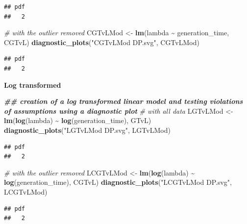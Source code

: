 \documentclass[
]{article}
\newenvironment{Shaded}{\begin{snugshade}}{\end{snugshade}}
\newcommand{\CommentTok}[1]{\textcolor[rgb]{0.56,0.35,0.01}{\textit{#1}}}
\newcommand{\DocumentationTok}[1]{\textcolor[rgb]{0.56,0.35,0.01}{\textbf{\textit{#1}}}}
\newcommand{\FunctionTok}[1]{\textcolor[rgb]{0.13,0.29,0.53}{\textbf{#1}}}
\newcommand{\NormalTok}[1]{#1}
\newcommand{\OtherTok}[1]{\textcolor[rgb]{0.56,0.35,0.01}{#1}}
\newcommand{\SpecialCharTok}[1]{\textcolor[rgb]{0.81,0.36,0.00}{\textbf{#1}}}
\newcommand{\StringTok}[1]{\textcolor[rgb]{0.31,0.60,0.02}{#1}}
\begin{document}
\begin{verbatim}
## pdf 
##   2
\end{verbatim}

\begin{Shaded}
\begin{Highlighting}[]
\CommentTok{\# with the outlier removed}
\NormalTok{CGTvLMod }\OtherTok{\textless{}{-}} \FunctionTok{lm}\NormalTok{(lambda }\SpecialCharTok{\textasciitilde{}}\NormalTok{ generation\_time, CGTvL)}
\FunctionTok{diagnostic\_plots}\NormalTok{(}\StringTok{"CGTvLMod DP.svg"}\NormalTok{, CGTvLMod)}
\end{Highlighting}
\end{Shaded}

\begin{verbatim}
## pdf 
##   2
\end{verbatim}

\textbf{Log transformed}

\begin{Shaded}
\begin{Highlighting}[]
\DocumentationTok{\#\# creation of a log transformed linear model and testing violations of assumptions using a diagnostic plot}
\CommentTok{\# with all data}
\NormalTok{LGTvLMod }\OtherTok{\textless{}{-}} \FunctionTok{lm}\NormalTok{(}\FunctionTok{log}\NormalTok{(lambda) }\SpecialCharTok{\textasciitilde{}} \FunctionTok{log}\NormalTok{(generation\_time), GTvL)}
\FunctionTok{diagnostic\_plots}\NormalTok{(}\StringTok{"LGTvLMod DP.svg"}\NormalTok{, LGTvLMod)}
\end{Highlighting}
\end{Shaded}

\begin{verbatim}
## pdf 
##   2
\end{verbatim}

\begin{Shaded}
\begin{Highlighting}[]
\CommentTok{\# with the outlier removed}
\NormalTok{LCGTvLMod }\OtherTok{\textless{}{-}} \FunctionTok{lm}\NormalTok{(}\FunctionTok{log}\NormalTok{(lambda) }\SpecialCharTok{\textasciitilde{}} \FunctionTok{log}\NormalTok{(generation\_time), CGTvL)}
\FunctionTok{diagnostic\_plots}\NormalTok{(}\StringTok{"LCGTvLMod DP.svg"}\NormalTok{, LCGTvLMod)}
\end{Highlighting}
\end{Shaded}

\begin{verbatim}
## pdf 
##   2
\end{verbatim}
\end{document}

